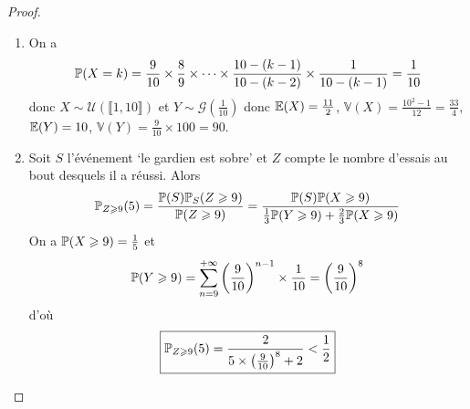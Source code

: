 \documentclass[12pt]{article}
\begin{document}
\begin{proof}
    \phantom{}
    \begin{enumerate}
        \item On a 
        \begin{equation}
            \P(X=k)=\frac{9}{10}\times\frac{8}{9}\times\dots\times\frac{10-(k-1)}{10-(k-2)}\times\frac{1}{10-(k-1)}=\frac{1}{10}
        \end{equation}
        donc $X\sim\mathcal{U}\left(\llbracket1,10\rrbracket\right)$ et $Y\sim\mathcal{G}\left(\frac{1}{10}\right)$ donc $\E(X)=\frac{11}{2}$, $\mathbb{V}(X)=\frac{10^{2}-1}{12}=\frac{33}{4}$, $\E(Y)=10$, $\mathbb{V}(Y)=\frac{9}{10}\times100=90$.

        \item Soit $S$ l'événement `le gardien est sobre' et $Z$ compte le nombre d'essais au bout desquels il a réussi. Alors 
        \begin{equation}
            \P_{Z\geqslant 9}(5)=\frac{\P(S)\P_{S}(Z\geqslant9)}{\P(Z\geqslant9)}=\frac{\P(S)\P(X\geqslant9)}{\frac{1}{3}\P(Y\geqslant9)+\frac{2}{3}\P(X\geqslant9)}
        \end{equation}
        On a $\P(X\geqslant9)=\frac{1}{5}$ et 
        \begin{equation}
            \P(Y\geqslant9)=\sum_{n=9}^{+\infty}\left(\frac{9}{10}\right)^{n-1}\times\frac{1}{10}=\left(\frac{9}{10}\right)^{8}
        \end{equation}
        d'où 
        \begin{equation}
            \boxed{\P_{Z\geqslant9}(5)=\frac{2}{5\times\left(\frac{9}{10}\right)^{8}+2}<\frac{1}{2}}
        \end{equation}
    \end{enumerate}
\end{proof}
\end{document}

